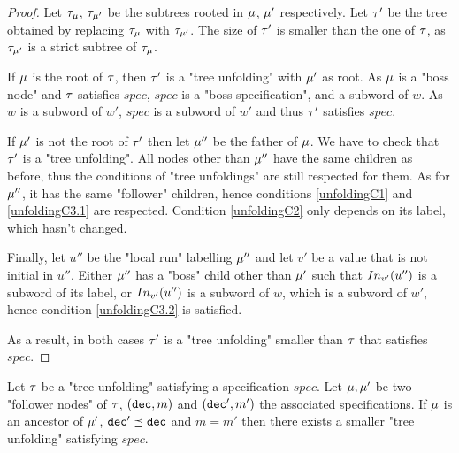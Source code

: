 \ifproofs
\begin{proof}
	Let $\tau_{\mu}$, $\tau_{\mu'}$ be the subtrees rooted in $\mu$, $\mu'$ respectively. 
	Let $\tau'$ be the tree obtained by replacing $\tau_{\mu}$ with $\tau_{\mu'}$. The size of $\tau'$ is smaller than the one of $\tau$, as $\tau_{\mu'}$ is a strict subtree of $\tau_{\mu}$.
	
	If $\mu$ is the root of $\tau$, then $\tau'$ is a "tree unfolding" with $\mu'$ as root. As $\mu$ is a "boss node" and $\tau$ satisfies $spec$, $spec$ is a "boss specification", and a subword of $w$. 
	As $w$ is a subword of $w'$, $spec$ is a subword of $w'$ and thus $\tau'$ satisfies $spec$.
	
	If  $\mu'$ is not the root of $\tau'$ then let $\mu''$ be the father of $\mu$. We have to check that $\tau'$ is a "tree unfolding". 
	All nodes other than $\mu''$ have the same children as before, thus the conditions of "tree unfoldings" are still respected for them.
	As for $\mu''$, it has the same "follower" children, hence conditions \ref{unfoldingC1} and \ref{unfoldingC3.1} are respected. Condition \ref{unfoldingC2} only depends on its label, which hasn't changed.
	
	Finally, let $u''$ be the "local run" labelling $\mu''$ and let $v'$ be a value that is not initial in $u''$. Either $\mu''$ has a "boss" child other than $\mu'$ such that $\vinput{v'}{u''}$ is a subword of its label, or $\vinput{v'}{u''}$ is a subword of $w$, which is a subword of $w'$, hence condition \ref{unfoldingC3.2} is satisfied. 
	
	As a result, in both cases $\tau'$ is a "tree unfolding" smaller than $\tau$ that satisfies $spec$. 
\end{proof}
\fi

\begin{lemma}
	Let $\tau$ be a "tree unfolding" satisfying a specification $spec$.
	Let $\mu, \mu'$ be two "follower nodes" of $\tau$, $(\mathtt{dec},m)$ and $(\mathtt{dec}',m')$ the associated specifications.
	If $\mu$ is an ancestor of $\mu'$, $\mathtt{dec}' \preceq \mathtt{dec}$ and $m=m'$ then there exists a smaller "tree unfolding" satisfying $spec$. 
\end{lemma}

